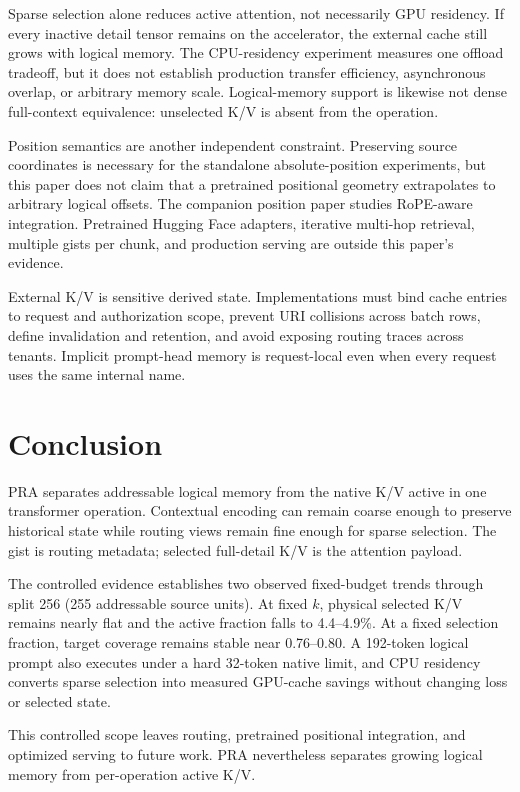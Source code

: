\documentclass[11pt]{article}
\begin{document}
Sparse selection alone reduces active attention, not necessarily GPU residency. If every
inactive detail tensor remains on the accelerator, the external cache still grows with logical
memory. The CPU-residency experiment measures one offload tradeoff, but it does not establish
production transfer efficiency, asynchronous overlap, or arbitrary memory scale. Logical-memory
support is likewise not dense full-context equivalence: unselected K/V is absent from the
operation.

Position semantics are another independent constraint. Preserving source coordinates is
necessary for the standalone absolute-position experiments, but this paper does not claim
that a pretrained positional geometry extrapolates to arbitrary logical offsets. The
companion position paper studies RoPE-aware integration. Pretrained Hugging Face adapters,
iterative multi-hop retrieval, multiple gists per chunk, and production serving are outside
this paper's evidence.

External K/V is sensitive derived state. Implementations must bind cache entries to request
and authorization scope, prevent URI collisions across batch rows, define invalidation and
retention, and avoid exposing routing traces across tenants. Implicit prompt-head memory is
request-local even when every request uses the same internal name.

\section{Conclusion}

PRA separates addressable logical memory from the native K/V active in one transformer
operation. Contextual encoding can remain coarse enough to preserve historical state while
routing views remain fine enough for sparse selection. The gist is routing metadata; selected
full-detail K/V is the attention payload.

The controlled evidence establishes two observed fixed-budget trends through split 256
(255 addressable source units). At fixed $k$, physical
selected K/V remains nearly flat and the active fraction falls to 4.4--4.9\%. At a fixed
selection fraction, target coverage remains stable near 0.76--0.80. A 192-token logical prompt
also executes under a hard 32-token native limit, and CPU residency converts sparse selection
into measured GPU-cache savings without changing loss or selected state.

This controlled scope leaves routing, pretrained positional integration, and optimized serving
to future work. PRA nevertheless separates growing logical memory from per-operation active K/V.
\end{document}
